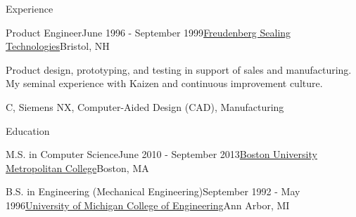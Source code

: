 \documentclass{resume}
\begin{document}
\begin{rSection}{Experience}
\begin{rSubsection}{Product Engineer}{June 1996 - September 1999}{\href{https://fst.com}{Freudenberg Sealing Technologies}}{Bristol, NH}
\item Product design, prototyping, and testing in support of sales and manufacturing. My seminal experience with Kaizen and continuous improvement culture.
\item C, Siemens NX, Computer-Aided Design (CAD), Manufacturing
\end{rSubsection}

\end{rSection}

\begin{rSection}{Education}

  \begin{rSubsection}{M.S. in Computer Science}{June 2010 - September 2013}{\href{https://www.bu.edu/}{Boston University Metropolitan College}}{Boston, MA}
  \item[]
  \end{rSubsection}

  \begin{rSubsection}{B.S. in Engineering (Mechanical Engineering)}{September 1992 - May 1996}{\href{https://www.umich.edu/}{University of Michigan College of Engineering}}{Ann Arbor, MI}
  \item[]
  \end{rSubsection}

\end{rSection}
\end{document}
